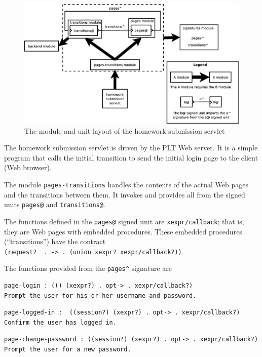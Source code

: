 \documentclass{article}
\begin{document}
\begin{figure}[ht]
\centering
\includegraphics[scale=.35]{design.eps}
\caption{The module and unit layout of the homework submission servlet}
\label{fig:layout}
\end{figure}

The homework submission servlet is driven by the PLT Web server. It is a simple
program that calls the initial transition to send the initial login page to
the client (Web browser).

The module \verb|pages-transitions| handles the contents of the actual Web
pages and the transitions between them. It invokes and provides all from the
signed units \verb|pages@| and \verb|transitions@|.

The functions defined in the \verb|pages@| signed unit are
\verb|xexpr/callback|; that is, they are Web pages with embedded procedures.
These embedded procedures (``transitions'') have the contract\\
\verb|(request?  . -> . (union xexpr? xexpr/callback?))|.

The functions provided from the \verb|pages^| signature are

\begin{verbatim}
page-login : (() (xexpr?) . opt-> . xexpr/callback?)
Prompt the user for his or her username and password.
\end{verbatim}

\begin{verbatim}
page-logged-in :  ((session?) (xexpr?) . opt-> . xexpr/callback?)
Confirm the user has logged in.
\end{verbatim}

\begin{verbatim}
page-change-password : ((session?) (xexpr?) . opt-> . xexpr/callback?)
Prompt the user for a new password.
\end{verbatim}
\end{document}
